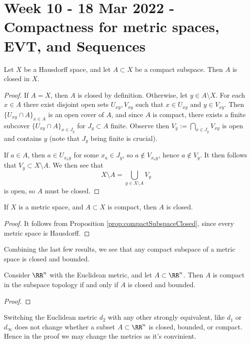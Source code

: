 \section{Week 10 - 18 Mar 2022 - Compactness for metric spaces, EVT, and
Sequences}
\begin{proposition}
  Let $X$ be a Hausdorff space, and let $A\subset X$ be a compact subspace. Then
  $A$ is closed in $X$.
  \label{prop:compactSubspaceClosed}
\end{proposition}
\begin{proof}
  If $A=X$, then $A$ is closed by definition. Otherwise, let $y\in A\setminus
  X$. For each $x\in A$ there exist disjoint open sets $U_{xy}, V_{xy}$ such
  that $x\in U_{xy}$ and $y\in V_{xy}$.
  Then $\{U_{xy}\cap A\}_{x\in A}$ is an open cover of $A$, and since $A$ is
  compact, there exists a finite subcover $\{U_{xy}\cap A\}_{x\in J_y}$ for
  $J_y\subset A$ finite. Observe then $V_y:= \bigcap_{x\in J_y} V_{xy}$ is open
  and contains $y$ (note that $J_y$ being finite is crucial). 

  If $a\in A$, then $a\in U_{x_a y}$ for some $x_a\in J_y$, so $a\not\in
  V_{x_a y}$, hence $a\not\in V_y$. It then follows that $V_y\subset X\setminus
  A$. We then see that
  \[X\setminus A = \bigcup_{y\in X\setminus A} V_y\]
  is open, so $A$ must be closed.
\end{proof}
\begin{corollary}
  If $X$ is a metric space, and $A\subset X$ is compact, then $A$ is closed.
  \label{<+label+>}
\end{corollary}
\begin{proof}
  It follows from Proposition \ref{prop:compactSubspaceClosed}, since every
  metric space is Hausdorff.
\end{proof}
Combining the last few results, we see that any compact subspace of a metric
space is closed and bounded.
\begin{theorem}
  Consider $\RR^n$ with the Euclidean metric, and let $A\subset \RR^n$. Then $A$
  is compact in the subspace topology if and only if $A$ is closed and bounded.
  \label{thm:heineBorel}
\end{theorem}
\begin{proof}
  
\end{proof}
\begin{remark}
  Switching the Euclidean metric $d_2$ with any other strongly equivalent, like
  $d_1$ or $d_{\infty}$ does not change whether a subset $A\subset\RR^n$ is
  closed, bounded, or compact. Hence in the proof we may change the metrics as
  it's convinient.
  \label{<+label+>}
\end{remark}

